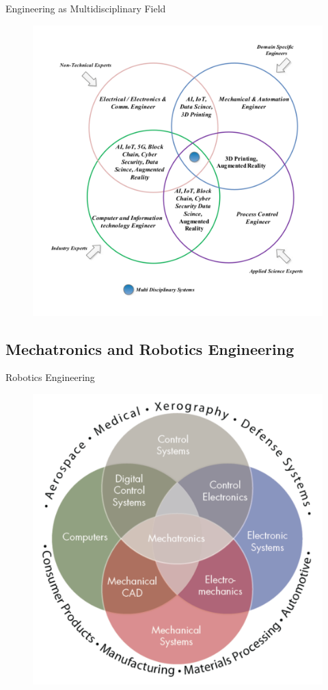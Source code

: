 {
\begin{frame}{Engineering as Multidisciplinary Field}
    \begin{figure}
        \centering
        \includegraphics[width=0.55\linewidth]{./figs/multidisciplinary-engigneering/versions/drawing-v00.png}
        \caption{}
    \end{figure}
\end{frame}
}


\subsection{Mechatronics and Robotics Engineering}
\begin{frame}{Robotics Engineering }
    \begin{figure}
        \centering
        \includegraphics[width=0.5\linewidth]{./figs/robotics/versions/drawing.png}
        \caption{}
    \end{figure}
\end{frame}



